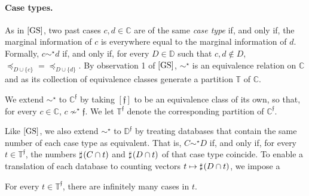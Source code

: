 \documentclass[12pt,a4paper,twoside]{article}
\newcommand{\gsii}{$\textup{[GS]}$}
\newcommand{\novel}{\mathfrak f}
\newcommand{\preceqb}{\mathbin{\preceq}}
\newcommand{\countof}{\mathbin{\sharp}\hskip1pt}
\newcommand{\mbbd}{{\mathds D}}
\newcommand{\mbbdp}{{\mathds D^{\novel}}}
\newcommand{\mbbc}{{\mathds C}}
\newcommand{\mbbcp}{{\mathds C^{\novel}}}
\newcommand{\mbbt}{{\mathds {T}}}
\newcommand{\mbbtp}{{\mathds{T} ^ \novel }}
\begin{document}



\paragraph{Case types.}
As in \gsii, two past cases $ c , d \in \mbbc $ are of the same \emph{case type}
if, and only if, the marginal information of $ c $ is everywhere equal to the
marginal information of $ d $. Formally, $ c \sim ^{ \star } d $ if, and only
if, for every $ D \in \mbbd $ such that $ c , d \notin D $,
$ \preceqb _ { D \cup \{ c \} } = \preceqb _ { D \cup \{ d \} }$.  By
observation 1 of \gsii, $ \sim ^{ \star }$ is an equivalence relation on
$ \mbbc $ and as its collection of equivalence classes generate a partition
$\mbbt$ of $\mbbc$.

We extend $ \sim ^{ \star } $ to $ \mbbcp $ by taking $ [ \novel ]$ to be an
equivalence class of its own, so that, for every $ c \in \mbbc $,
$ c \nsim ^{ \star } \novel $.  We let $\mbbtp$ denote the corresponding
partition of $\mbbcp$.

Like \gsii, we also extend $\sim^{\star}$ to $\mbbdp$ by treating databases that
contain the same number of each case type as equivalent. That is,
$C \sim ^{\star } D$ if, and only if, for every $t \in \mbbtp$, the numbers
$\countof (C \cap t)$ and $\countof (D \cap t) $ of that case type coincide. To
enable a translation of each database to counting vectors
$t \mapsto \countof (D \cap t) $, we impose a


\begin{assumption*}
For every  $ t \in \mbbtp$, there are infinitely many cases in $ t $.
\end{assumption*}

\end{document}
